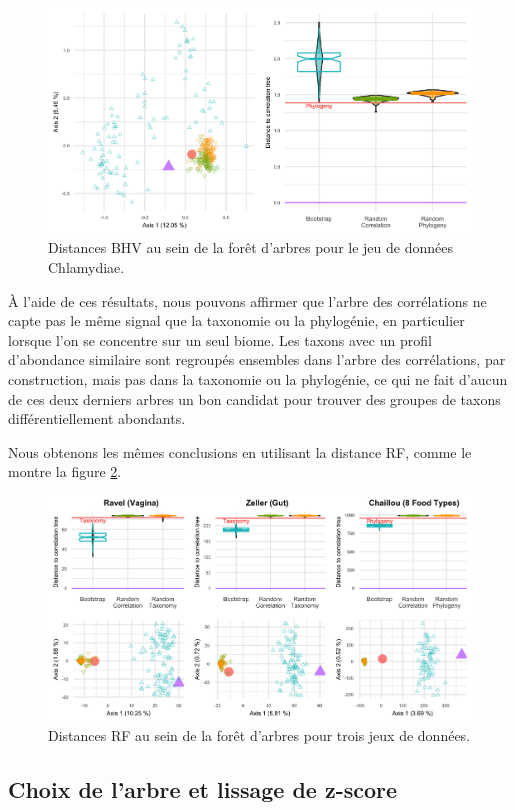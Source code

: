 \documentclass[12pt,a4paper]{reedthesis}
\theoremstyle{definition}
\theoremstyle{definition}
\theoremstyle{definition}
\theoremstyle{remark}
\begin{document}
\begin{figure}[t]

{\centering \includegraphics[width=0.9\linewidth]{img/foretbhv_ch} 

}

\caption{Distances BHV au sein de la forêt d'arbres pour le jeu de données Chlamydiae.}\label{fig:foretbhvbis}
\end{figure}
À l'aide de ces résultats, nous pouvons affirmer que l'arbre des corrélations ne capte pas le même signal que la taxonomie ou la phylogénie, en particulier lorsque l'on se concentre sur un seul biome. Les taxons avec un profil d'abondance similaire sont regroupés ensembles dans l'arbre des corrélations, par construction, mais pas dans la taxonomie ou la phylogénie, ce qui ne fait d'aucun de ces deux derniers arbres un bon candidat pour trouver des groupes de taxons différentiellement abondants.

Nous obtenons les mêmes conclusions en utilisant la distance RF, comme le montre la figure \ref{fig:foretrf}.


\begin{figure}

{\centering \includegraphics[width=0.9\linewidth]{img/foretrf} 

}

\caption{Distances RF au sein de la forêt d'arbres pour trois jeux de données.}\label{fig:foretrf}
\end{figure}
\hypertarget{checktreefdr}{%
\subsection{Choix de l'arbre et lissage de z-score}\label{checktreefdr}}
\end{document}

